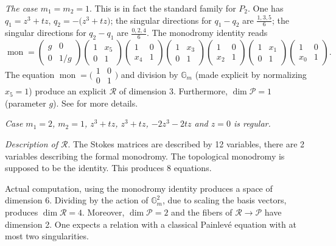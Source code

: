 \documentclass[10pt,a4paper]{amsart}
\numberwithin{equation}{section}
\begin{document}
 {\it The case $m_1=m_2=1$}. This is in fact the standard family for $P_2$. One has $q_1=z^3+tz$, $q_2=-\bigl(z^3+tz\bigr)$; the singular directions for $q_1-q_2$ are $\frac{1,3,5}{6}$; the singular directions for
 $q_2-q_1$ are $\frac{0,2,4}{6}$. The monodromy identity reads
 \[\operatorname{mon}=\begin{pmatrix}g& 0\\ 0 &1/g \end{pmatrix} \begin{pmatrix}1& x_5\\0& 1\end{pmatrix} \begin{pmatrix}1& 0\\x_4& 1\end{pmatrix} \begin{pmatrix}1& x_3\\0& 1\end{pmatrix} \begin{pmatrix}1& 0\\x_2& 1 \end{pmatrix}\begin{pmatrix}1& x_1\\0& 1 \end{pmatrix} \begin{pmatrix}1& 0\\x_0& 1\end{pmatrix}.\]
 The equation $\operatorname{mon}=\bigl(\begin{smallmatrix}1& 0\\0& 1\end{smallmatrix}\bigr)$ and division by $\mathbb{G}_m$ (made explicit by normalizing $x_5=1$) produce an explicit
 $\mathcal{R}$ of dimension 3. Furthermore, $\dim \mathcal{P}=1$ (parameter $g$). See \cite[Section~3.9]{vdP-Sa} for more details.

{\it Case $m_1=2$, $m_2=1$, $z^3+tz$, $z^3+tz$, $-2z^3-2tz$ and $z=0$ is regular.}

{\it Description of $\mathcal{R}$}.
The Stokes matrices are described by 12 variables, there are 2 variables describing the formal monodromy. The topological monodromy is
supposed to be the identity. This produces 8 equations.

Actual computation, using the monodromy identity produces a space of dimension 6. Dividing by the action of
$\mathbb{G}_m^2$, due to scaling the basis vectors, produces $\dim \mathcal{R}=4$. Moreover, $\dim \mathcal{P}=2$ and the fibers of
$\mathcal{R}\rightarrow \mathcal{P}$ have dimension 2. One expects a relation with a classical Painlev\'e equation with at most two singularities.
\end{document}
